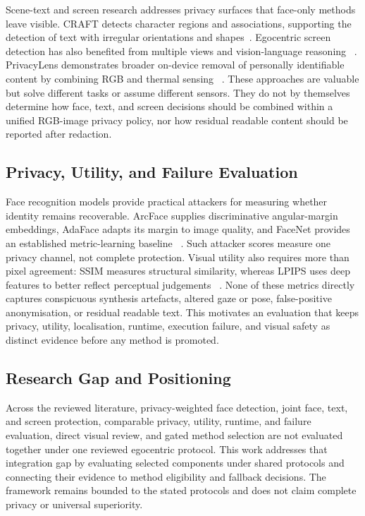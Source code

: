 \documentclass[10pt,twocolumn]{IEEEtran}
\begin{document}
Scene-text and screen research addresses privacy surfaces that face-only methods
leave visible. CRAFT detects character regions and associations, supporting the
detection of text with irregular orientations and shapes~\cite{baek2019craft}.
Egocentric screen
detection has also benefited from multiple views and vision-language reasoning
~\cite{li2026screen}. PrivacyLens demonstrates broader on-device removal of
personally identifiable content by combining RGB and thermal sensing
~\cite{iravantchi2024privacylens}. These approaches are valuable but solve
different tasks or assume different sensors. They do not by themselves determine
how face, text, and screen decisions should be combined within a unified
RGB-image privacy policy,
nor how residual readable content should be reported after redaction.

\subsection{Privacy, Utility, and Failure Evaluation}

Face recognition models provide practical attackers for measuring whether
identity remains recoverable. ArcFace supplies discriminative angular-margin
embeddings, AdaFace adapts its margin to image quality, and FaceNet provides an
established metric-learning baseline
~\cite{deng2019arcface,kim2022adaface,schroff2015facenet}. Such attacker
scores measure one privacy channel, not complete protection. Visual utility also
requires more than pixel agreement: SSIM measures structural similarity, whereas
LPIPS uses deep features to better reflect perceptual judgements
~\cite{wang2004ssim,zhang2018lpips}. None of these metrics directly captures
conspicuous synthesis artefacts, altered gaze or pose, false-positive
anonymisation, or residual readable text. This motivates an evaluation that keeps
privacy, utility, localisation, runtime, execution failure, and visual safety as
distinct evidence before any method is promoted.

\subsection{Research Gap and Positioning}

Across the reviewed literature, privacy-weighted face detection, joint face,
text, and screen protection, comparable privacy, utility, runtime, and failure
evaluation, direct visual review, and gated method selection are not evaluated
together under one reviewed egocentric protocol. This work addresses that
integration gap by evaluating selected components under shared protocols and
connecting their evidence to method eligibility and fallback decisions. The
framework remains bounded to the stated protocols and does not claim complete
privacy or universal superiority.
\end{document}
